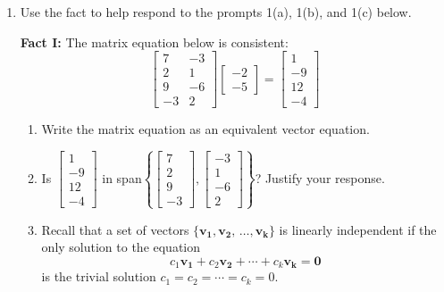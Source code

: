 \documentclass[basic]{inVerba-notes}
\begin{document}
\begin{enumerate}[align=left, leftmargin=0pt, labelindent=\parindent, listparindent=\parindent, labelwidth=0pt, itemindent=!]\color{minor}
  \item Use the fact to help respond to the prompts 1(a), 1(b), and 1(c) below.
  
  \textbf{Fact I:} The matrix equation below is consistent:
  \[%
  \begin{bmatrix}7 & -3\\2 & 1\\9 & -6\\-3 & 2 \end{bmatrix}
  \begin{bmatrix}-2\\-5\end{bmatrix}
  =
  \begin{bmatrix}1\\-9\\12\\-4\end{bmatrix}
  \]%
  
  \begin{enumerate}
    \item {} Write the matrix equation as an equivalent vector equation.
    \item {} Is \(\begin{bmatrix} 1 \\ -9 \\ 12\\-4 \end{bmatrix}\) in span\(\left\{ \begin{bmatrix} 7 \\ 2 \\ 9 \\ -3 \end{bmatrix}, \begin{bmatrix} -3 \\ 1 \\ -6 \\ 2 \end{bmatrix} \right\} \)? Justify your response. 
    \newpage
    \item {} Recall that a set of vectors \(\{ \bm{v_1}, \bm{v_2}, \, \ldots , \bm{v_k} \}\) is linearly independent if the only solution to the equation 
    \[c_1 \bm{v_1}+ c_2 \bm{v_2} + \cdots + c_k \bm{v_k} = \bm{0}
    \]
    is the trivial solution \(c_1=c_2=\cdots =c_k=0\).


\end{enumerate}
\end{enumerate}
\end{document}
